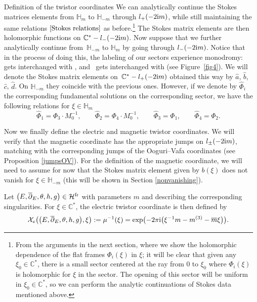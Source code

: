 \begin{subsubsection} {Definition of the twistor coordinates}
We can analytically continue the Stokes matrices elements from $\mathbb{H}_m$ to $\mathbb{H}_{-m}$ through \linebreak $l_+({-}2{\rm i}m)$, while still maintaining the same relations $\eqref{Stokes relations}$ as before.\footnote{From the arguments in the next section, where we show the holomorphic dependence of the flat frames $\Phi_i(\xi)$ in $\xi$; it will be clear that given any $\xi_0\in \mathbb{C}^*$, there is a small sector centered at the ray from $0$ to $\xi_0$ where $\Phi_i(\xi)$ is holomorphic for $\xi$ in the sector. The opening of this sector will be uniform in $\xi_0\in \mathbb{C}^*$, so we can perform the analytic continuations of Stokes data mentioned above.} The Stokes matrix elements are then holomorphic functions on $\mathbb{C}^*-l_-(-2{\rm i}m)$. Now suppose that we further analytically continue from~$\mathbb{H}_{-m}$ to $\mathbb{H}_m$ by going through $l_-(-2{\rm i}m)$. Notice that in the process of doing this, the labeling of our sectors experience monodromy:  gets interchanged with , and~ gets interchanged with  (see Figure~\ref{fig4}). We will denote the Stokes matrix elements on~${\mathbb{C}^*-l_+(-2{\rm i}m)}$ obtained this way by $\widehat{a}$, $\widehat{b}$, $\widehat{c}$, $\widehat{d}$. On $\mathbb{H}_{-m}$ they coincide with the previous ones. However, if we denote by $\widehat{\Phi}_i$ the corresponding fundamental solutions on the corresponding sector, we have the following relations for $\xi \in \mathbb{H}_{m}$
\begin{equation}\label{Stokes relations 2}
 \widehat{\Phi}_1=\Phi_3\cdot M_0^{-1},\qquad
 \widehat{\Phi}_2=\Phi_4\cdot M_0^{-1},\qquad
 \widehat{\Phi}_3=\Phi_1,\qquad
 \widehat{\Phi}_4=\Phi_2.
\end{equation}

Now we finally define the electric and magnetic twistor coordinates. We will verify that the magnetic coordinate has the appropriate jumps on $l_{\pm}(-2{\rm i}m)$, matching with the corresponding jumps of the Ooguri--Vafa coordinates (see Proposition \ref{jumpsOV}). For the definition of the magnetic coordinate, we will need to assume for now that the Stokes matrix element given by $b(\xi)$ does not vanish for $\xi \in \mathbb{H}_{-m}$ (this will be shown in Section \ref{nonvanishing}).

\begin{Definition} Let $\bigl(E,\overline{\partial}_E,\theta,h,g\bigr)\in \mathcal{H}^{{\rm fr}}$ with parameters $m$ and  describing the corresponding singularities. For $\xi \in \mathbb{C}^*$, the electric twistor coordinate is then defined by
\begin{equation}\label{defetc}
\mathcal{X}_e\bigl(\bigl(E,\overline{\partial}_E,\theta,h,g\bigr),\xi\bigr):=\mu^{-1}(\xi)=\exp\bigl(-2\pi {\rm i} \bigl(\xi^{-1}m -m^{(3)}-\overline{m}\xi\bigr)\bigr).
\end{equation}
\end{Definition}


\end{subsubsection}
